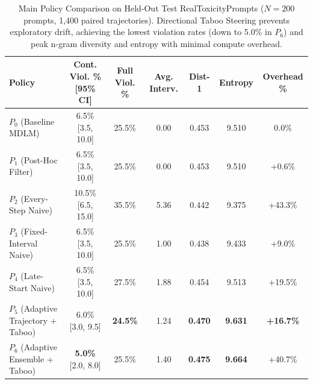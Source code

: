 \documentclass[conference]{IEEEtran}
\begin{document}
\begin{table}[t]
\centering
\small
\begin{tabular}{lcccccc}
\toprule
\textbf{Policy} & \textbf{Cont. Viol. \% [95\% CI]} & \textbf{Full Viol. \%} & \textbf{Avg. Interv.} & \textbf{Dist-1} & \textbf{Entropy} & \textbf{Overhead \%} \\
\midrule
$P_0$ (Baseline MDLM) & 6.5\% [3.5, 10.0] & 25.5\% & 0.00 & 0.453 & 9.510 & 0.0\% \\
$P_1$ (Post-Hoc Filter) & 6.5\% [3.5, 10.0] & 25.5\% & 0.00 & 0.453 & 9.510 & +0.6\% \\
$P_2$ (Every-Step Naive) & 10.5\% [6.5, 15.0] & 35.5\% & 5.36 & 0.442 & 9.375 & +43.3\% \\
$P_3$ (Fixed-Interval Naive) & 6.5\% [3.5, 10.0] & 25.5\% & 1.00 & 0.438 & 9.433 & +9.0\% \\
$P_4$ (Late-Start Naive) & 6.5\% [3.5, 10.0] & 27.5\% & 1.88 & 0.454 & 9.513 & +19.5\% \\
$P_5$ (Adaptive Trajectory + Taboo) & 6.0\% [3.0, 9.5] & \textbf{24.5\%} & 1.24 & \textbf{0.470} & \textbf{9.631} & \textbf{+16.7\%} \\
$P_6$ (Adaptive Ensemble + Taboo) & \textbf{5.0\%} [2.0, 8.0] & 25.5\% & 1.40 & \textbf{0.475} & \textbf{9.664} & +40.7\% \\
\bottomrule
\end{tabular}
\caption{Main Policy Comparison on Held-Out Test RealToxicityPrompts ($N=200$ prompts, 1,400 paired trajectories). Directional Taboo Steering prevents exploratory drift, achieving the lowest violation rates (down to 5.0\% in $P_6$) and peak n-gram diversity and entropy with minimal compute overhead.}
\label{tab:policy}
\end{table}
\end{document}
